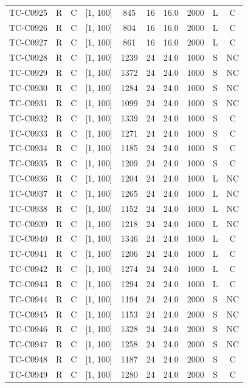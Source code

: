 \begin{longtable}{lccccccccc}
TC-C0925 & R & C & [1, 100] & 845 & 16 & 16.0 & 2000 & L & C \\
TC-C0926 & R & C & [1, 100] & 804 & 16 & 16.0 & 2000 & L & C \\
TC-C0927 & R & C & [1, 100] & 861 & 16 & 16.0 & 2000 & L & C \\
TC-C0928 & R & C & [1, 100] & 1239 & 24 & 24.0 & 1000 & S & NC \\
TC-C0929 & R & C & [1, 100] & 1372 & 24 & 24.0 & 1000 & S & NC \\
TC-C0930 & R & C & [1, 100] & 1284 & 24 & 24.0 & 1000 & S & NC \\
TC-C0931 & R & C & [1, 100] & 1099 & 24 & 24.0 & 1000 & S & NC \\
TC-C0932 & R & C & [1, 100] & 1339 & 24 & 24.0 & 1000 & S & C \\
TC-C0933 & R & C & [1, 100] & 1271 & 24 & 24.0 & 1000 & S & C \\
TC-C0934 & R & C & [1, 100] & 1185 & 24 & 24.0 & 1000 & S & C \\
TC-C0935 & R & C & [1, 100] & 1209 & 24 & 24.0 & 1000 & S & C \\
TC-C0936 & R & C & [1, 100] & 1204 & 24 & 24.0 & 1000 & L & NC \\
TC-C0937 & R & C & [1, 100] & 1265 & 24 & 24.0 & 1000 & L & NC \\
TC-C0938 & R & C & [1, 100] & 1152 & 24 & 24.0 & 1000 & L & NC \\
TC-C0939 & R & C & [1, 100] & 1218 & 24 & 24.0 & 1000 & L & NC \\
TC-C0940 & R & C & [1, 100] & 1346 & 24 & 24.0 & 1000 & L & C \\
TC-C0941 & R & C & [1, 100] & 1206 & 24 & 24.0 & 1000 & L & C \\
TC-C0942 & R & C & [1, 100] & 1274 & 24 & 24.0 & 1000 & L & C \\
TC-C0943 & R & C & [1, 100] & 1294 & 24 & 24.0 & 1000 & L & C \\
TC-C0944 & R & C & [1, 100] & 1194 & 24 & 24.0 & 2000 & S & NC \\
TC-C0945 & R & C & [1, 100] & 1153 & 24 & 24.0 & 2000 & S & NC \\
TC-C0946 & R & C & [1, 100] & 1328 & 24 & 24.0 & 2000 & S & NC \\
TC-C0947 & R & C & [1, 100] & 1258 & 24 & 24.0 & 2000 & S & NC \\
TC-C0948 & R & C & [1, 100] & 1187 & 24 & 24.0 & 2000 & S & C \\
TC-C0949 & R & C & [1, 100] & 1280 & 24 & 24.0 & 2000 & S & C \\

\end{longtable}
